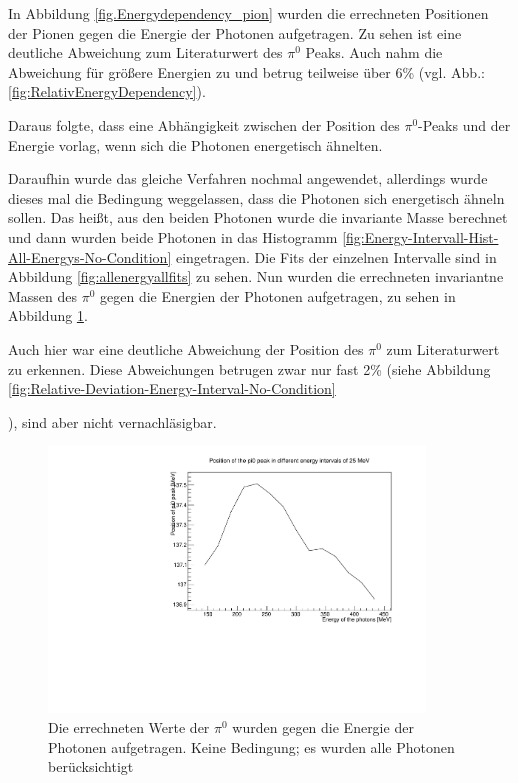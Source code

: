 \documentclass[a4paper,11pt,oneside,final,german,openbib,pdftex]{scrbook}
\begin{document}
{In Abbildung \ref{fig.Energydependency_pion} wurden die errechneten Positionen der Pionen gegen die Energie der Photonen aufgetragen. Zu sehen ist eine deutliche Abweichung zum Literaturwert des $\pi^0$ Peaks. Auch nahm die Abweichung für größere Energien zu und betrug teilweise über 6\% (vgl. Abb.:\ref{fig:RelativEnergyDependency}).
  
Daraus folgte, dass eine Abhängigkeit zwischen der Position des $\pi^0$-Peaks und der Energie vorlag, wenn sich die Photonen energetisch ähnelten.

Daraufhin wurde das gleiche Verfahren nochmal angewendet, allerdings wurde dieses mal die Bedingung weggelassen, dass die Photonen sich energetisch ähneln sollen. Das heißt, aus den beiden Photonen wurde die invariante Masse berechnet und dann wurden beide Photonen in das Histogramm  \ref{fig:Energy-Intervall-Hist-All-Energys-No-Condition} eingetragen.
Die Fits der einzelnen Intervalle sind in Abbildung \ref{fig:allenergyallfits} zu sehen. Nun wurden die errechneten invariantne Massen des $\pi^0$ gegen die Energien der Photonen aufgetragen, zu sehen in Abbildung \ref{fig:Energy-Intervall-No-Condition-Deviation-1303}. 

Auch hier war eine deutliche Abweichung der Position des $\pi^0$ zum Literaturwert zu erkennen. Diese Abweichungen betrugen zwar nur fast 2\% (siehe Abbildung \ref{fig:Relative-Deviation-Energy-Interval-No-Condition}}), sind aber nicht vernachl\"asigbar. 

\begin{figure}[h!]
	\begin{center}
		\includegraphics[width=100mm]{allenergydeviation1303}
		\caption{Die errechneten Werte der $\pi^0$ wurden gegen die Energie der Photonen aufgetragen. Keine Bedingung; es wurden alle Photonen ber\"ucksichtigt}
		\label{fig:Energy-Intervall-No-Condition-Deviation-1303}
	\end{center}
\end{figure}
\end{document}

